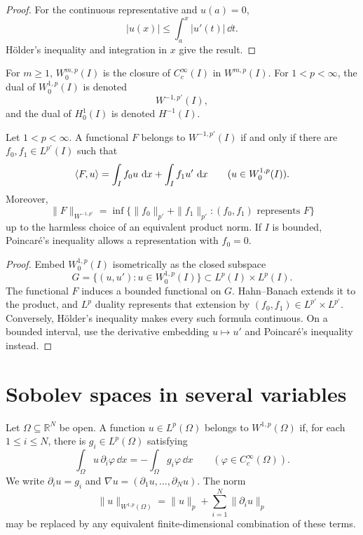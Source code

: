 \begin{proof}
For the continuous representative and $u(a)=0$,
\[
  |u(x)|\le\int_a^x|u'(t)|\,\dd t.
\]
Hölder's inequality and integration in $x$ give the result.
\end{proof}

\begin{notedefinition}
For $m\ge1$, $W_0^{m,p}(I)$ is the closure of $C_c^\infty(I)$ in
$W^{m,p}(I)$.  For $1<p<\infty$, the dual of $W_0^{1,p}(I)$ is denoted
\[
  W^{-1,p'}(I),
\]
and the dual of $H_0^1(I)$ is denoted $H^{-1}(I)$.
\end{notedefinition}

\begin{notetheorem}[Representation of $W^{-1,p'}$]
Let $1<p<\infty$.  A functional $F$ belongs to $W^{-1,p'}(I)$ if and only if
there are $f_0,f_1\in L^{p'}(I)$ such that
\[
  \left\langle F,u\right\rangle
  =\int_I f_0u\,\,\mathrm{d} x+\int_I f_1u'\,\,\mathrm{d} x
  \qquad(u\in W_0^{1,p}(I)).
\]
Moreover,
\[
  \|F\|_{W^{-1,p'}}
  =\inf\bigl\{
       \|f_0\|_{p'}+\|f_1\|_{p'}:
       (f_0,f_1)\text{ represents }F
     \bigr\}
\]
up to the harmless choice of an equivalent product norm.  If $I$ is bounded,
Poincaré's inequality allows a representation with $f_0=0$.
\end{notetheorem}

\begin{proof}
Embed $W_0^{1,p}(I)$ isometrically as the closed subspace
\[
  G=\{(u,u'):u\in W_0^{1,p}(I)\}
  \subset L^p(I)\times L^p(I).
\]
The functional $F$ induces a bounded functional on $G$.  Hahn--Banach extends
it to the product, and $L^p$ duality represents that extension by
$(f_0,f_1)\in L^{p'}\times L^{p'}$.  Conversely, Hölder's inequality makes
every such formula continuous.  On a bounded interval, use the derivative
embedding $u\mapsto u'$ and Poincaré's inequality instead.
\end{proof}

\section{Sobolev spaces in several variables}

\begin{notedefinition}
Let $\Omega\subseteq\mathbb R^N$ be open.  A function $u\in L^p(\Omega)$
belongs to $W^{1,p}(\Omega)$ if, for each $1\le i\le N$, there is
$g_i\in L^p(\Omega)$ satisfying
\[
  \int_\Omega u\,\partial_i\varphi\,\dd x
  =-\int_\Omega g_i\varphi\,\dd x
  \qquad(\varphi\in C_c^\infty(\Omega)).
\]
We write $\partial_i u=g_i$ and
$\nabla u=(\partial_1u,\ldots,\partial_Nu)$.  The norm
\[
  \|u\|_{W^{1,p}(\Omega)}
  =\|u\|_p+\sum_{i=1}^N\|\partial_i u\|_p
\]
may be replaced by any equivalent finite-dimensional combination of these
terms.
\end{notedefinition}

